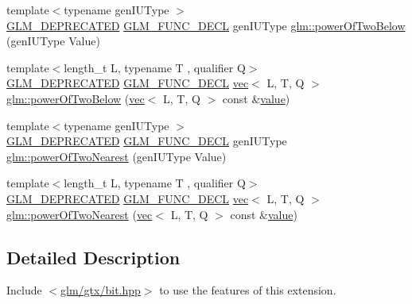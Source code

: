 \begin{DoxyCompactItemize}
\item 
{\footnotesize template$<$typename gen\+I\+U\+Type $>$ }\\\hyperlink{setup_8hpp_a8edfb48cdc249a3ee48406bf179023dc}{G\+L\+M\+\_\+\+D\+E\+P\+R\+E\+C\+A\+T\+ED} \hyperlink{setup_8hpp_ab2d052de21a70539923e9bcbf6e83a51}{G\+L\+M\+\_\+\+F\+U\+N\+C\+\_\+\+D\+E\+CL} gen\+I\+U\+Type \hyperlink{group__gtx__bit_ga3de7df63c589325101a2817a56f8e29d}{glm\+::power\+Of\+Two\+Below} (gen\+I\+U\+Type Value)
\item 
{\footnotesize template$<$length\+\_\+t L, typename T , qualifier Q$>$ }\\\hyperlink{setup_8hpp_a8edfb48cdc249a3ee48406bf179023dc}{G\+L\+M\+\_\+\+D\+E\+P\+R\+E\+C\+A\+T\+ED} \hyperlink{setup_8hpp_ab2d052de21a70539923e9bcbf6e83a51}{G\+L\+M\+\_\+\+F\+U\+N\+C\+\_\+\+D\+E\+CL} \hyperlink{structglm_1_1vec}{vec}$<$ L, T, Q $>$ \hyperlink{group__gtx__bit_gaf78ddcc4152c051b2a21e68fecb10980}{glm\+::power\+Of\+Two\+Below} (\hyperlink{structglm_1_1vec}{vec}$<$ L, T, Q $>$ const \&\hyperlink{_s_d_l__opengl__glext_8h_a8ad81492d410ff2ac11f754f4042150f}{value})
\item 
{\footnotesize template$<$typename gen\+I\+U\+Type $>$ }\\\hyperlink{setup_8hpp_a8edfb48cdc249a3ee48406bf179023dc}{G\+L\+M\+\_\+\+D\+E\+P\+R\+E\+C\+A\+T\+ED} \hyperlink{setup_8hpp_ab2d052de21a70539923e9bcbf6e83a51}{G\+L\+M\+\_\+\+F\+U\+N\+C\+\_\+\+D\+E\+CL} gen\+I\+U\+Type \hyperlink{group__gtx__bit_ga5f65973a5d2ea38c719e6a663149ead9}{glm\+::power\+Of\+Two\+Nearest} (gen\+I\+U\+Type Value)
\item 
{\footnotesize template$<$length\+\_\+t L, typename T , qualifier Q$>$ }\\\hyperlink{setup_8hpp_a8edfb48cdc249a3ee48406bf179023dc}{G\+L\+M\+\_\+\+D\+E\+P\+R\+E\+C\+A\+T\+ED} \hyperlink{setup_8hpp_ab2d052de21a70539923e9bcbf6e83a51}{G\+L\+M\+\_\+\+F\+U\+N\+C\+\_\+\+D\+E\+CL} \hyperlink{structglm_1_1vec}{vec}$<$ L, T, Q $>$ \hyperlink{group__gtx__bit_gac87e65d11e16c3d6b91c3bcfaef7da0b}{glm\+::power\+Of\+Two\+Nearest} (\hyperlink{structglm_1_1vec}{vec}$<$ L, T, Q $>$ const \&\hyperlink{_s_d_l__opengl__glext_8h_a8ad81492d410ff2ac11f754f4042150f}{value})
\end{DoxyCompactItemize}


\subsection{Detailed Description}
Include $<$\hyperlink{bit_8hpp}{glm/gtx/bit.\+hpp}$>$ to use the features of this extension.

